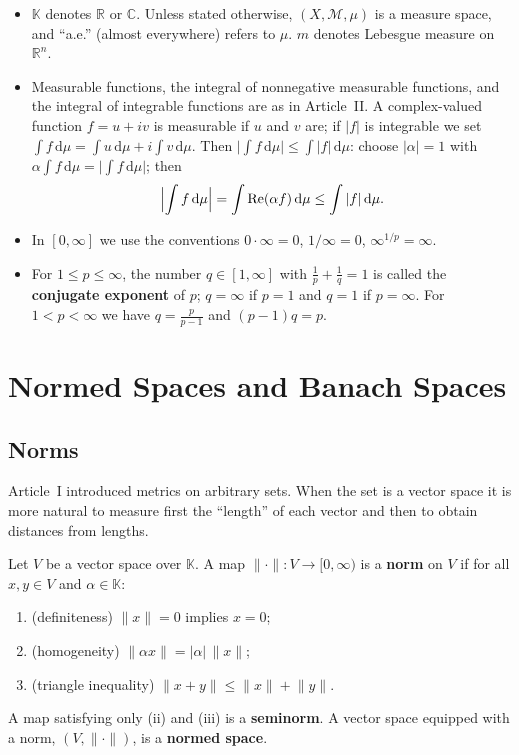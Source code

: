 \documentclass[11pt]{article}
\newcommand{\K}{\mathbb{K}}
\newcommand{\R}{\mathbb{R}}
\newcommand{\C}{\mathbb{C}}
\newcommand{\M}{\mathcal{M}}
\newcommand{\norm}[1]{\lVert #1\rVert}
\newcommand{\dmu}{\,\mathrm{d}\mu}
\begin{document}
\begin{itemize}
\item $\K$ denotes $\R$ or $\C$. Unless stated otherwise, $(X,\M,\mu)$ is a measure space, and ``a.e.'' (almost everywhere) refers to $\mu$. $m$ denotes Lebesgue measure on $\R^{n}$.
\item Measurable functions, the integral of nonnegative measurable functions, and the integral of integrable functions are as in Article~II. A complex-valued function $f=u+iv$ is measurable if $u$ and $v$ are; if $|f|$ is integrable we set $\int f\dmu=\int u\dmu+i\int v\dmu$. Then $\bigl|\int f\dmu\bigr|\le\int|f|\dmu$: choose $|\alpha|=1$ with $\alpha\int f\dmu=\bigl|\int f\dmu\bigr|$; then
\[
\Bigl|\int f\dmu\Bigr|=\int \operatorname{Re}(\alpha f)\dmu\le\int|f|\dmu .
\]
\item In $[0,\infty]$ we use the conventions $0\cdot\infty=0$, $1/\infty=0$, $\infty^{1/p}=\infty$.
\item For $1\le p\le\infty$, the number $q\in[1,\infty]$ with $\frac1p+\frac1q=1$ is called the \textbf{conjugate exponent} of $p$; $q=\infty$ if $p=1$ and $q=1$ if $p=\infty$. For $1<p<\infty$ we have $q=\frac{p}{p-1}$ and $(p-1)q=p$.
\end{itemize}

\section{Normed Spaces and Banach Spaces}

\subsection{Norms}

Article~I introduced metrics on arbitrary sets. When the set is a vector space it is more natural to measure first the ``length'' of each vector and then to obtain distances from lengths.

\begin{definition}[Norm]
Let $V$ be a vector space over $\K$. A map $\norm{\cdot}:V\to[0,\infty)$ is a \textbf{norm} on $V$ if for all $x,y\in V$ and $\alpha\in\K$:
\begin{enumerate}
\item (definiteness) $\norm{x}=0$ implies $x=0$;
\item (homogeneity) $\norm{\alpha x}=|\alpha|\,\norm{x}$;
\item (triangle inequality) $\norm{x+y}\le\norm{x}+\norm{y}$.
\end{enumerate}
A map satisfying only (ii) and (iii) is a \textbf{seminorm}. A vector space equipped with a norm, $(V,\norm{\cdot})$, is a \textbf{normed space}.
\end{definition}
\end{document}
